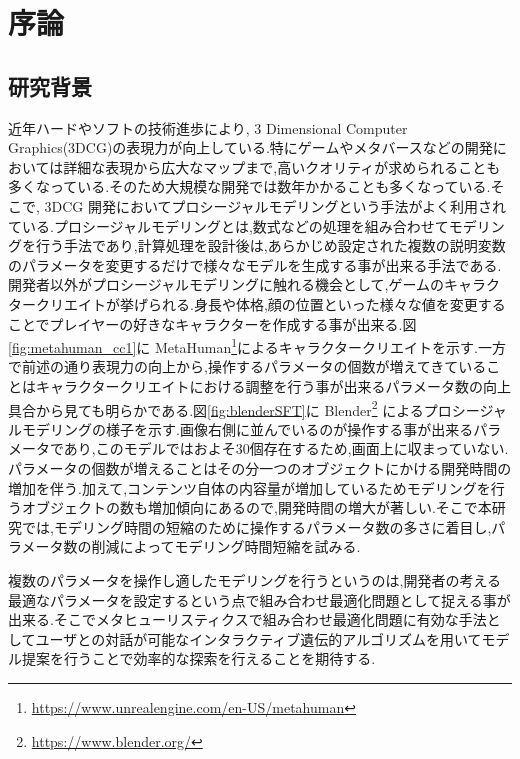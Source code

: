 \newpage 
\setcounter{page}{1}

\chapter{序論}

\section{研究背景}
近年ハードやソフトの技術進歩により, 3 Dimensional Computer Graphics(3DCG)の表現力が向上している.特にゲームやメタバースなどの開発においては詳細な表現から広大なマップまで,高いクオリティが求められることも多くなっている.そのため大規模な開発では数年かかることも多くなっている.そこで, 3DCG 開発においてプロシージャルモデリングという手法がよく利用されている.プロシージャルモデリングとは,数式などの処理を組み合わせてモデリングを行う手法であり,計算処理を設計後は,あらかじめ設定された複数の説明変数のパラメータを変更するだけで様々なモデルを生成する事が出来る手法である.開発者以外がプロシージャルモデリングに触れる機会として,ゲームのキャラクタークリエイトが挙げられる.身長や体格,顔の位置といった様々な値を変更することでプレイヤーの好きなキャラクターを作成する事が出来る.図\ref{fig:metahuman_cc1}に MetaHuman\footnote{\url{https://www.unrealengine.com/en-US/metahuman}}によるキャラクタークリエイトを示す.一方で前述の通り表現力の向上から,操作するパラメータの個数が増えてきていることはキャラクタークリエイトにおける調整を行う事が出来るパラメータ数の向上具合から見ても明らかである.図\ref{fig:blenderSFT}に Blender\footnote{\url{https://www.blender.org/}} によるプロシージャルモデリングの様子を示す.画像右側に並んでいるのが操作する事が出来るパラメータであり,このモデルではおよそ30個存在するため,画面上に収まっていない.パラメータの個数が増えることはその分一つのオブジェクトにかける開発時間の増加を伴う.加えて,コンテンツ自体の内容量が増加しているためモデリングを行うオブジェクトの数も増加傾向にあるので,開発時間の増大が著しい.そこで本研究では,モデリング時間の短縮のために操作するパラメータ数の多さに着目し,パラメータ数の削減によってモデリング時間短縮を試みる. 


複数のパラメータを操作し適したモデリングを行うというのは,開発者の考える最適なパラメータを設定するという点で組み合わせ最適化問題として捉える事が出来る.そこでメタヒューリスティクスで組み合わせ最適化問題に有効な手法としてユーザとの対話が可能なインタラクティブ遺伝的アルゴリズムを用いてモデル提案を行うことで効率的な探索を行えることを期待する.


